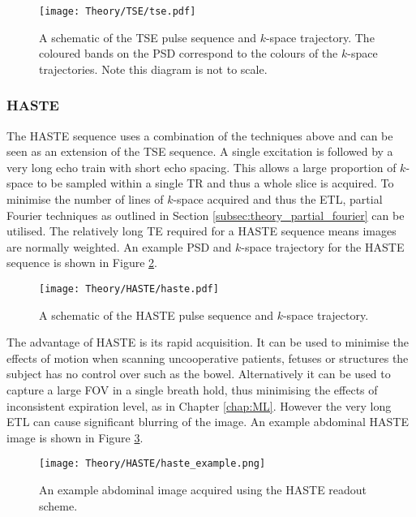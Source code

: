 \begin{figure}[H]
	\centering
	\texttt{[image: Theory/TSE/tse.pdf]}
	\caption{A schematic of the \ac{TSE} pulse sequence and $k$-space trajectory. The coloured bands on the \ac{PSD} correspond to the colours of the $k$-space trajectories. Note this diagram is not to scale.}
	\label{fig:theory_tse}	
\end{figure}

\subsubsection{\ac*{HASTE}}
The \ac{HASTE} sequence uses a combination of the techniques above and can be seen as an extension of the \ac{TSE} sequence. A single excitation is followed by a very long echo train with short echo spacing. This allows a large proportion of $k$-space to be sampled within a single \ac{TR} and thus a whole slice is acquired. To minimise the number of lines of $k$-space acquired and thus the \ac{ETL}, partial Fourier techniques as outlined in Section \ref{subsec:theory_partial_fourier} can be utilised. The relatively long \ac{TE} required for a \ac{HASTE} sequence means images are normally \ttwo weighted. An example \ac{PSD} and $k$-space trajectory for the \ac{HASTE} sequence is shown in Figure \ref{fig:theory_haste_psd}.

\begin{figure}[H]
	\centering
	\texttt{[image: Theory/HASTE/haste.pdf]}
	\caption{A schematic of the \ac{HASTE} pulse sequence and $k$-space trajectory.}
	\label{fig:theory_haste_psd}	
\end{figure}

The advantage of \ac{HASTE} is its rapid acquisition. It can be used to minimise the effects of motion when scanning uncooperative patients, fetuses or structures the subject has no control over such as the bowel. Alternatively it can be used to capture a large \ac{FOV} in a single breath hold, thus minimising the effects of inconsistent expiration level, as in Chapter \ref{chap:ML}. However the very long \ac{ETL} can cause significant blurring of the image. An example abdominal \ac{HASTE} image is shown in Figure \ref{fig:theory_haste_example}.

\begin{figure}[H]
	\centering
	\texttt{[image: Theory/HASTE/haste\_example.png]}
	\caption{An example abdominal image acquired using the \ac{HASTE} readout scheme.}
	\label{fig:theory_haste_example}
\end{figure}

